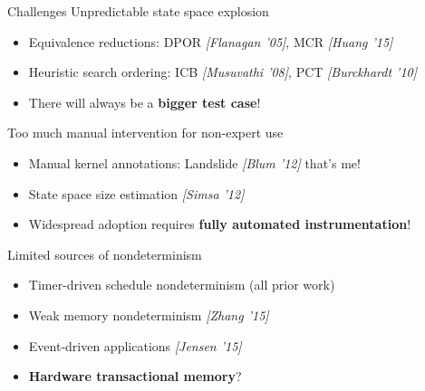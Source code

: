 \documentclass[xcolor=dvipsnames]{beamer}
\begin{document}
\begin{frame}{Challenges} %
	Unpredictable state space explosion
	\begin{itemize}
		\item Equivalence reductions: DPOR {\em [Flanagan '05]}, MCR {\em [Huang '15]}
		\item Heuristic search ordering: ICB {\em [Musuvathi '08]}, PCT {\em [Burckhardt '10]}
		\item There will always be a {\bf bigger test case}!
	\end{itemize}
	\pause
	\linegap

	Too much manual intervention for non-expert use
	\begin{itemize}
		\item Manual kernel annotations: Landslide {\em [Blum '12]} {\tiny that's me!}
		\item State space size estimation {\em [Simsa '12]}
		\item Widespread adoption requires {\bf fully automated instrumentation}!
	\end{itemize}
	\pause
	\linegap

	Limited sources of nondeterminism
	\begin{itemize}
		\item Timer-driven schedule nondeterminism (all prior work)
		\item Weak memory nondeterminism {\em [Zhang '15]}
		\item Event-driven applications {\em [Jensen '15]}
		\item {\bf Hardware transactional memory}?
	\end{itemize}
\end{frame}

\end{document}
